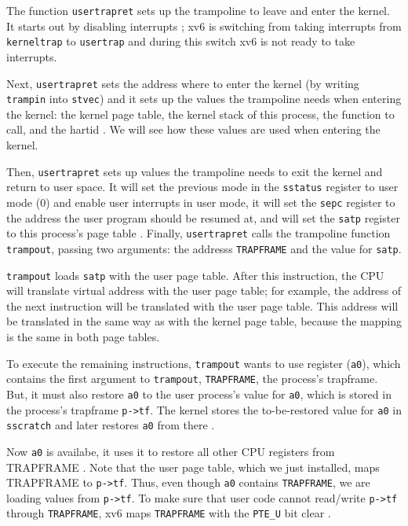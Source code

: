 The function \lstinline{usertrapret}
 sets up the trampoline to leave
and enter the kernel.  It starts out by disabling interrupts
; xv6 is switching from taking
interrupts from \lstinline{kerneltrap} to \lstinline{usertrap} and
during this switch xv6 is not ready to take interrupts.

Next, \lstinline{usertrapret} sets the address where to enter the
kernel (by writing \lstinline{trampin} into \lstinline{stvec}) and it
sets up the values the trampoline needs when entering the kernel: the
kernel page table, the kernel stack of this process, the function to
call, and the hartid
.  We will see
how these values are used when entering the kernel.

Then, \lstinline{usertrapret} sets up values the trampoline needs to
exit the kernel and return to user space.  It will set the
previous mode in the \lstinline{sstatus} register to user mode (0) and
enable user interrupts in user mode, it will set the \lstinline{sepc}
register to the address the user program should be resumed at, and
will set the \lstinline{satp} register to this process's page table
.
Finally, \lstinline{usertrapret} calls
the trampoline function \lstinline{trampout}, passing two arguments: the addresss
\lstinline{TRAPFRAME} and the value for \lstinline{satp}.

\lstinline{trampout}  loads
\lstinline{satp} with the user page table.  After this instruction,
the CPU will translate virtual address with the user page table;
for example, the address of the next instruction will be translated
with the user page table.  This address will be translated in the same
way as with the kernel page table, because the mapping is the same in
both page tables.

To execute the remaining instructions, \lstinline{trampout} wants to
use register (\lstinline{a0}), which contains the first argument to
\lstinline{trampout}, \lstinline{TRAPFRAME}, the process's
trapframe. But, it must also restore \lstinline{a0} to the user
process's value for \lstinline{a0}, which is stored in the process's
trapframe \lstinline{p->tf}.  The kernel stores the to-be-restored value for
\lstinline{a0} in \lstinline{sscratch} and later restores
\lstinline{a0} from there .

Now \lstinline{a0} is availabe, it uses it to restore all other CPU
registers from TRAPFRAME .
Note that the user page table, which we just installed, maps
TRAPFRAME to \lstinline{p->tf}.  Thus, even though \lstinline{a0}
contains \lstinline{TRAPFRAME}, we are loading values from
\lstinline{p->tf}.  To make sure that user code cannot read/write
\lstinline{p->tf} through \lstinline{TRAPFRAME}, xv6 maps
\lstinline{TRAPFRAME} with the \lstinline{PTE_U} bit clear
.


